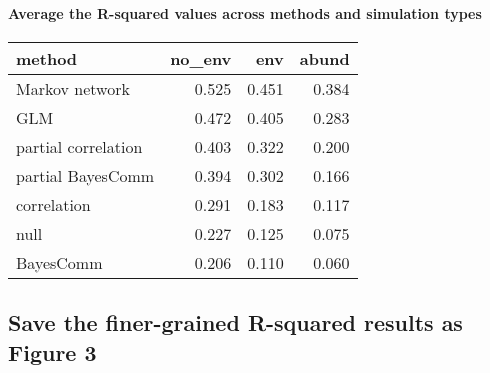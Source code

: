\documentclass[11pt,]{article}
\newenvironment{Shaded}{\begin{snugshade}}{\end{snugshade}}
\newcommand{\KeywordTok}[1]{\textcolor[rgb]{0.13,0.29,0.53}{\textbf{{#1}}}}
\newcommand{\DataTypeTok}[1]{\textcolor[rgb]{0.13,0.29,0.53}{{#1}}}
\newcommand{\DecValTok}[1]{\textcolor[rgb]{0.00,0.00,0.81}{{#1}}}
\newcommand{\StringTok}[1]{\textcolor[rgb]{0.31,0.60,0.02}{{#1}}}
\newcommand{\NormalTok}[1]{{#1}}
\let\oldparagraph\paragraph
\renewcommand{\paragraph}[1]{\oldparagraph{#1}\mbox{}}
\begin{document}
\paragraph{Average the R-squared values across methods and simulation
types}\label{average-the-r-squared-values-across-methods-and-simulation-types}

\begin{Shaded}
\end{Shaded}

\begin{longtable}[c]{@{}lrrr@{}}
\toprule
method & no\_env & env & abund\tabularnewline
\midrule
\endhead
Markov network & 0.525 & 0.451 & 0.384\tabularnewline
GLM & 0.472 & 0.405 & 0.283\tabularnewline
partial correlation & 0.403 & 0.322 & 0.200\tabularnewline
partial BayesComm & 0.394 & 0.302 & 0.166\tabularnewline
correlation & 0.291 & 0.183 & 0.117\tabularnewline
null & 0.227 & 0.125 & 0.075\tabularnewline
BayesComm & 0.206 & 0.110 & 0.060\tabularnewline
\bottomrule
\end{longtable}

\subsection{Save the finer-grained R-squared results as Figure
3}\label{save-the-finer-grained-r-squared-results-as-figure-3}
\end{document}

